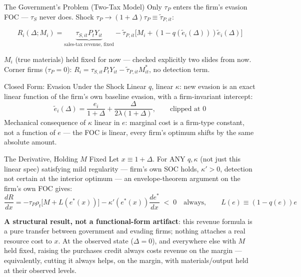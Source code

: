 \documentclass[
  ignorenonframetext,
  aspectratio=169,
]{beamer}
\begin{document}
\begin{frame}{The Government's Problem (Two-Tax Model)}
\protect{}\label{the-governments-problem-two-tax-model}
Only \(\tau_P\) enters the firm's evasion FOC --- \(\tau_S\) never does.
Shock \(\tau_P\to(1+\Delta)\tau_P\equiv\tilde\tau_{P,it}\):

\[
R_i(\Delta;M_i) = \underbrace{\tau_{S,it}P_tY_{it}}_{\text{sales-tax revenue, fixed}} - \tilde\tau_{P,it}\big[M_i+(1-q(\tilde e_i(\Delta)))\tilde e_i(\Delta)\big]
\]

\(M_i\) (true materials) held fixed for now --- checked explicitly two
slides from now. Corner firms (\(\tau_P=0\)):
\(R_i=\tau_{S,it}P_tY_{it}-\tilde\tau_{P,it}M^*_{it}\), no detection
term.
\end{frame}

\begin{frame}{Closed Form: Evasion Under the Shock}
\protect{}\label{closed-form-evasion-under-the-shock}
Linear \(q\), linear \(\kappa\): new evasion is an exact linear function
of the firm's own baseline evasion, with a firm-invariant intercept: \[
\tilde e_i(\Delta) = \frac{e_i}{1+\Delta} + \frac{\Delta}{2\lambda(1+\Delta)},\qquad \text{clipped at }0
\] Mechanical consequence of \(\kappa\) linear in \(e\): marginal cost
is a firm-type constant, not a function of \(e\) --- the FOC is linear,
every firm's optimum shifts by the same absolute amount.
\end{frame}

\begin{frame}{The Derivative, Holding \(M\) Fixed}
\protect{}\label{the-derivative-holding-m-fixed}
Let \(x\equiv1+\Delta\). For ANY \(q,\kappa\) (not just this linear
spec) satisfying mild regularity --- firm's own SOC holds,
\(\kappa'>0\), detection not certain at the interior optimum --- an
envelope-theorem argument on the firm's own FOC gives: \[
\frac{dR}{dx} = -\tau_P\rho_t\big[M+L(e^*(x))\big] - \kappa'(e^*(x))\frac{de^*}{dx} \;<\;0\quad\text{always},\qquad L(e)\equiv(1-q(e))e
\]

\textbf{A structural result, not a functional-form artifact}: this
revenue formula is a pure transfer between government and evading firms;
nothing attaches a real resource cost to \(x\). At the observed state
(\(\Delta=0\)), and everywhere else with \(M\) held fixed, raising the
purchases credit always costs revenue on the margin --- equivalently,
cutting it always helps, on the margin, with materials/output held at
their observed levels.
\end{frame}
\end{document}
